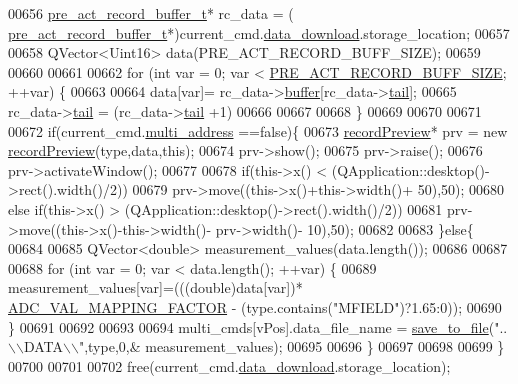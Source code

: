 \begin{DoxyCode}
00656         \hyperlink{a00003_d4/d7d/a00093}{pre\_act\_record\_buffer\_t}* rc\_data = (
      \hyperlink{a00003_d4/d7d/a00093}{pre\_act\_record\_buffer\_t}*)current\_cmd.\hyperlink{a00001_a5cfeaed4d4f8e51070a324c0ba893ebe}{data\_download}.storage\_location;
00657 
00658         QVector<Uint16> data(PRE\_ACT\_RECORD\_BUFF\_SIZE);
00659 
00660 
00661 
00662         \textcolor{keywordflow}{for} (\textcolor{keywordtype}{int} var = 0; var < \hyperlink{a00003_a18dcecc16ded13fa622e0913e73442e6}{PRE\_ACT\_RECORD\_BUFF\_SIZE}; ++var) \{
00663 
00664             data[var]= rc\_data->\hyperlink{a00003_a5f6608d29ecab36269ae25b2e7afb1f3}{buffer}[rc\_data->\hyperlink{a00003_a3c4762f0dfae85a9efc17a36c6cb84a6}{tail}];
00665             rc\_data->\hyperlink{a00003_a3c4762f0dfae85a9efc17a36c6cb84a6}{tail} = (rc\_data->\hyperlink{a00003_a3c4762f0dfae85a9efc17a36c6cb84a6}{tail} +1)%
00666 
00667 
00668         \}
00669 
00670 
00671 
00672         \textcolor{keywordflow}{if}(current\_cmd.\hyperlink{a00001_a8e69b971c61ced27a7567efd2bf0db59}{multi\_address} ==\textcolor{keyword}{false})\{
00673         \hyperlink{a00020}{recordPreview}* prv = \textcolor{keyword}{new} \hyperlink{a00020}{recordPreview}(type,data,\textcolor{keyword}{this});
00674         prv->show();
00675         prv->raise();
00676         prv->activateWindow();
00677 
00678         \textcolor{keywordflow}{if}(this->x() < (QApplication::desktop()->rect().width()/2))
00679         prv->move((this->x()+this->width()+ 50),50);
00680         \textcolor{keywordflow}{else} \textcolor{keywordflow}{if}(this->x() > (QApplication::desktop()->rect().width()/2))
00681         prv->move((this->x()-this->width()- prv->width()- 10),50);
00682 
00683         \}\textcolor{keywordflow}{else}\{
00684 
00685             QVector<double> measurement\_values(data.length());
00686 
00687 
00688             \textcolor{keywordflow}{for} (\textcolor{keywordtype}{int} var = 0; var < data.length(); ++var) \{
00689                 measurement\_values[var]=(((double)data[var])*
      \hyperlink{a00031_ada92d3eeeec0cbeee41e76a52d145792}{ADC\_VAL\_MAPPING\_FACTOR} - (type.contains(\textcolor{stringliteral}{"MFIELD"})?1.65:0));
00690             \}
00691 
00692 
00693 
00694             multi\_cmds[vPos].data\_file\_name = \hyperlink{a00006_a0114355b9f626345cf77d6f714f51468}{save\_to\_file}(\textcolor{stringliteral}{"..\(\backslash\)\(\backslash\)DATA\(\backslash\)\(\backslash\)"},type,0,&
      measurement\_values);
00695 
00696         \}
00697 
00698 
00699     \}
00700 
00701 
00702     free(current\_cmd.\hyperlink{a00001_a5cfeaed4d4f8e51070a324c0ba893ebe}{data\_download}.storage\_location);

\end{DoxyCode}
